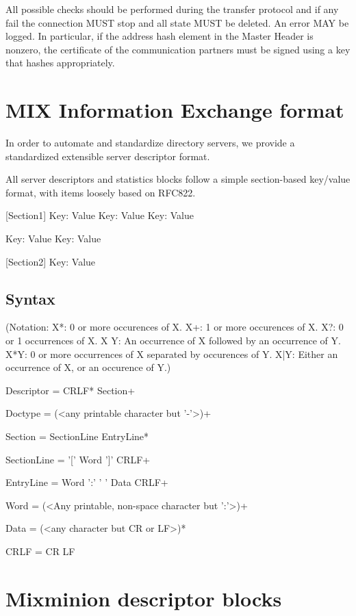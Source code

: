 All possible checks should be performed during the transfer protocol
and if any fail the connection MUST stop and all state MUST
be deleted. An error MAY be logged. In particular, if the address
hash element in the Master Header is nonzero, the certificate of
the communication partners must be signed using a key that hashes
appropriately.

\section{MIX Information Exchange format}

In order to automate and standardize directory servers, we provide 
a standardized extensible server descriptor format.

All server descriptors and statistics blocks follow a simple
section-based key/value format, with items loosely based on RFC822.

[Section1]
Key: Value
Key: Value
Key: Value

Key: Value
Key: Value

[Section2]
Key: Value

\subsection{Syntax}

(Notation:  X*: 0 or more occurences of X.
            X+: 1 or more occurences of X.
	    X?: 0 or 1 occurrences of X.
            X Y: An occurrence of X followed by an occurrence of Y.
	    X*{Y}: 0 or more occurrences of X separated by occurences
                  of Y.
            X|Y: Either an occurrence of X, or an occurence of Y.)

Descriptor = CRLF* Section+ 

Doctype = (<any printable character but '-'>)+

Section = SectionLine EntryLine*

SectionLine = '[' Word ']' CRLF+

EntryLine = Word ':' ' ' Data CRLF+

Word = (<Any printable, non-space character but ':'>)+

Data = (<any character but CR or LF>)*

CRLF = CR LF

\section{Mixminion descriptor blocks}

